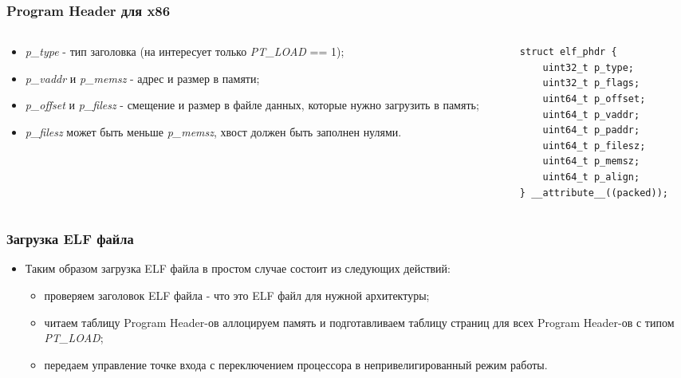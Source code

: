 \begin{frame}[fragile]
\frametitle{Program Header для x86}
\begin{columns}
  \begin{column}{.65\linewidth}
    \begin{itemize}
      \item \emph{p\_type} - тип заголовка (на интересует только
      \emph{PT\_LOAD} == 1);
      \item \emph{p\_vaddr} и \emph{p\_memsz} - адрес и размер в памяти;
      \item \emph{p\_offset} и \emph{p\_filesz} - смещение и размер в файле
      данных, которые нужно загрузить в память;
      \item \emph{p\_filesz} может быть меньше \emph{p\_memsz}, хвост должен
      быть заполнен нулями.
    \end{itemize}
  \end{column}
  \begin{column}{.36\linewidth}
    \begin{lstlisting}
struct elf_phdr {
    uint32_t p_type;
    uint32_t p_flags;
    uint64_t p_offset;
    uint64_t p_vaddr;
    uint64_t p_paddr;
    uint64_t p_filesz;
    uint64_t p_memsz;
    uint64_t p_align;
} __attribute__((packed));
    \end{lstlisting}
  \end{column}
\end{columns}
\end{frame}

\begin{frame}
\frametitle{Загрузка ELF файла}
\begin{itemize}
  \item Таким образом загрузка ELF файла в простом случае состоит из следующих
  действий:
  \begin{itemize}
    \item проверяем заголовок ELF файла - что это ELF файл для нужной
    архитектуры;
    \item читаем таблицу Program Header-ов аллоцируем память и подготавливаем
    таблицу страниц для всех Program Header-ов с типом \emph{PT\_LOAD};
    \item передаем управление точке входа с переключением процессора в
    непривелигированный режим работы.
  \end{itemize}
\end{itemize}
\end{frame}
